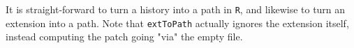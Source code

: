 It is straight-forward to turn a history into a path in \texttt{R}, and likewise to
turn an extension into a path. Note that \texttt{extToPath} actually ignores the extension
itself, instead computing the patch going "via" the empty file.
\begin{code}%
\>[0]\AgdaSpace{}%
\AgdaSymbol{:}\AgdaSpace{}%
\AgdaSymbol{\{}\AgdaSpace{}%
\AgdaSymbol{:}\AgdaSpace{}%
\AgdaSymbol{\}}\AgdaSpace{}%
\AgdaSymbol{(}\AgdaSpace{}%
\AgdaSymbol{:}\AgdaSpace{}%
\AgdaSpace{}%
\AgdaSpace{}%
\AgdaSymbol{)}\AgdaSpace{}%
\AgdaSpace{}%
\AgdaSpace{}%
\AgdaInductiveConstructor{[]}\AgdaSpace{}%
\AgdaSpace{}%
\AgdaSpace{}%
\<%
\\
\>[0]\AgdaSpace{}%
\AgdaInductiveConstructor{[]}\AgdaSpace{}%
\AgdaSymbol{=}\AgdaSpace{}%
\<%
\\
\>[0]\AgdaSpace{}%
\AgdaSymbol{(}\AgdaSpace{}%
\AgdaSpace{}%
\AgdaSpace{}%
\AgdaSpace{}%
\AgdaOperator{\AgdaInductiveConstructor{::}}\AgdaSpace{}%
\AgdaSymbol{)}\AgdaSpace{}%
\AgdaSymbol{=}\AgdaSpace{}%
\AgdaSymbol{(}\AgdaSpace{}%
\AgdaSymbol{)}\AgdaSpace{}%
\AgdaSpace{}%
\AgdaSpace{}%
\AgdaSpace{}%
\AgdaSpace{}%
\<%
\\
\>[0]\AgdaSpace{}%
\AgdaSymbol{(}\AgdaSpace{}%
\AgdaSpace{}%
\AgdaOperator{\AgdaInductiveConstructor{::}}\AgdaSpace{}%
\AgdaSymbol{)}\AgdaSpace{}%
\AgdaSymbol{=}\AgdaSpace{}%
\AgdaSymbol{(}\AgdaSpace{}%
\AgdaSymbol{)}\AgdaSpace{}%
\AgdaSpace{}%
\AgdaSpace{}%
\AgdaSpace{}%
\<%
\\
%
\\[\AgdaEmptyExtraSkip]%
\>[0]\AgdaSpace{}%
\AgdaSymbol{:}%
\>[748I]\AgdaSymbol{\{}\AgdaSpace{}%
\AgdaSpace{}%
\AgdaSymbol{:}\AgdaSpace{}%
\AgdaSymbol{\}}\AgdaSpace{}%
\AgdaSymbol{\{}\AgdaSpace{}%
\AgdaSymbol{:}\AgdaSpace{}%

\end{code}

